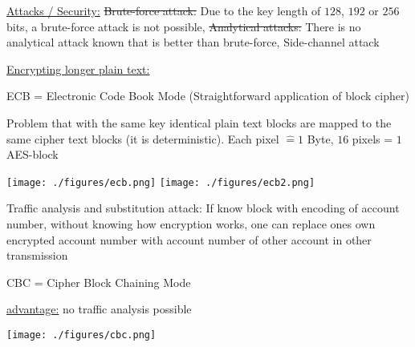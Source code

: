 \documentclass[landscape, a4paper]{article}
\begin{document}
\begin{minipage}[t]{0.2\linewidth}
	\begin{betterlist}
		\item \underline{Attacks / Security:} \sout{Brute-force attack:} Due to the key length of $128$, $192$ or $256$ bits, a brute-force attack is not possible, \sout{Analytical attacks:} There is no analytical attack known that is better than brute-force, Side-channel attack
		\item \underline{Encrypting longer plain text:}
		\begin{betterlist}
			\item \alert{ECB} = Electronic Code Book Mode (Straightforward application of block cipher)
			\begin{betterlist}
				\item Problem that with the same key identical plain text blocks are mapped to the same cipher text blocks (it is deterministic). Each pixel $\hat= 1$ Byte, $16$ pixels = $1$ AES-block
			\end{betterlist}
			\texttt{[image: ./figures/ecb.png]}
			\texttt{[image: ./figures/ecb2.png]}
			\begin{betterlist}
				\item \alert{Traffic analysis and substitution attack:} If know block with encoding of account number, without knowing how encryption works, one can replace ones own encrypted account number with account number of other account in other transmission
			\end{betterlist}
			\item \alert{CBC} = Cipher Block Chaining Mode
			\begin{betterlist}
				\item \underline{advantage:} no \alert{traffic analysis} possible
			\end{betterlist}

			\texttt{[image: ./figures/cbc.png]}


\end{betterlist}
\end{betterlist}
\end{minipage}
\end{document}

